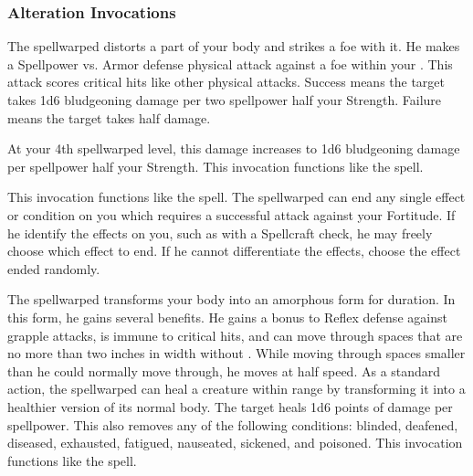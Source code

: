         \subsubsection{Alteration Invocations}
            The spellwarped distorts a part of your body and strikes a foe with it.
            He makes a Spellpower vs. Armor defense physical attack against a foe within your .
            This attack scores critical hits like other physical attacks.
            Success means the target takes 1d6 bludgeoning damage per two spellpower \add half your Strength.
            Failure means the target takes half damage.
            \par At your 4th spellwarped level, this damage increases to 1d6 bludgeoning damage per spellpower \add half your Strength.
            This invocation functions like the  spell.

            This invocation functions like the  spell.
            The spellwarped can end any single effect or condition on you which requires a successful attack against your Fortitude.
            If he identify the effects on you, such as with a Spellcraft check, he may freely choose which effect to end.
            If he cannot differentiate the effects, choose the effect ended randomly.

            The spellwarped transforms your body into an amorphous form for \durshort duration.
            In this form, he gains several benefits.
            He gains a  bonus to Reflex defense against grapple attacks, is immune to critical hits, and can move through spaces that are no more than two inches in width without .
            While moving through spaces smaller than he could normally move through, he moves at half speed.
            As a standard action, the spellwarped can heal a creature within \rngclose range by transforming it into a healthier version of its normal body.
            The target heals 1d6 points of damage per spellpower.
            This also removes any of the following conditions: blinded, deafened, diseased, exhausted, fatigued, nauseated, sickened, and poisoned.
            This invocation functions like the  spell.

